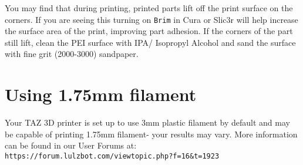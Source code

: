 You may find that during printing, printed parts lift off the print surface on the corners. If you are seeing this turning on \texttt{Brim} in Cura or Slic3r will help increase the surface area of the print, improving part adhesion. If the corners of the part still lift, clean the PEI surface with IPA/ Isopropyl Alcohol and sand the surface with fine grit (2000-3000) sandpaper.


\section{Using 1.75mm filament}

Your TAZ 3D printer is set up to use 3mm plastic filament by default and may be capable of printing 1.75mm filament- your results may vary. More information can be found in our User Forums at: \texttt{https://forum.lulzbot.com/viewtopic.php?f=16\&t=1923}
